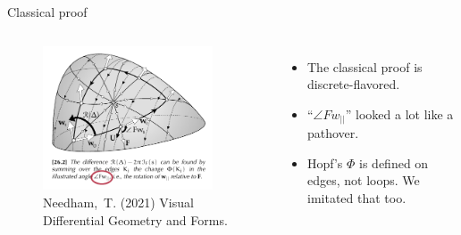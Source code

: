 \begin{frame}{Classical proof}
\begin{columns}
\vspace{12pt}
\begin{figure}
\includegraphics[width=0.9\textwidth]{figs/needham_triangle_circ.pdf}
\caption{{Needham,~T. (2021) Visual Differential Geometry and Forms.}}
\end{figure}
\vspace{-12pt}
\begin{itemize}
\item The classical proof is discrete-flavored.
\item ``\( \angle Fw_{||} \)'' looked a lot like a pathover.
\item Hopf's \( \Phi \) is defined on edges, not loops. We imitated that too.
\end{itemize}
\end{columns}
\end{frame}
